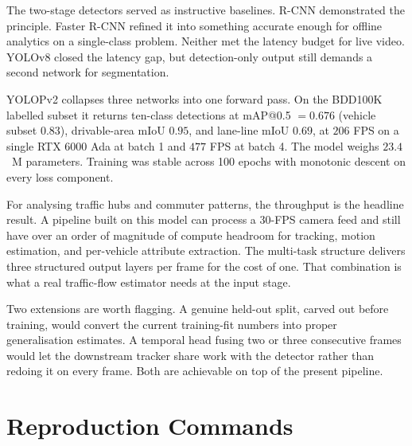 \documentclass[12pt,a4paper]{report}
\begin{document}
The two-stage detectors served as instructive baselines. R-CNN demonstrated the principle. Faster R-CNN refined it into something accurate enough for offline analytics on a single-class problem. Neither met the latency budget for live video. YOLOv8 closed the latency gap, but detection-only output still demands a second network for segmentation.

YOLOPv2 collapses three networks into one forward pass. On the BDD100K labelled subset it returns ten-class detections at mAP@0.5 $= 0.676$ (vehicle subset $0.83$), drivable-area mIoU $0.95$, and lane-line mIoU $0.69$, at $206$ FPS on a single RTX 6000 Ada at batch 1 and $477$ FPS at batch 4. The model weighs $23.4$~M parameters. Training was stable across 100 epochs with monotonic descent on every loss component.

For analysing traffic hubs and commuter patterns, the throughput is the headline result. A pipeline built on this model can process a $30$-FPS camera feed and still have over an order of magnitude of compute headroom for tracking, motion estimation, and per-vehicle attribute extraction. The multi-task structure delivers three structured output layers per frame for the cost of one. That combination is what a real traffic-flow estimator needs at the input stage.

Two extensions are worth flagging. A genuine held-out split, carved out before training, would convert the current training-fit numbers into proper generalisation estimates. A temporal head fusing two or three consecutive frames would let the downstream tracker share work with the detector rather than redoing it on every frame. Both are achievable on top of the present pipeline.

\appendix

\chapter{Reproduction Commands}
\end{document}
